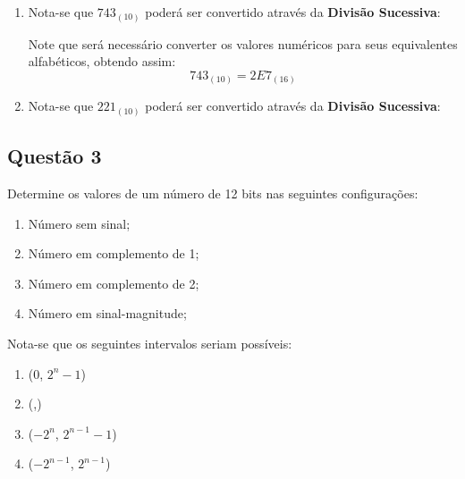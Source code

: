 \documentclass{article}
\begin{document}
\begin{resolution}
\begin{enumerate}[rightmargin = \leftmargin]
                    \item Nota-se que $743_{(10)}$ poderá ser convertido através da \textbf{Divisão Sucessiva}:
                        \begin{figure}[H]
                            \centering
                        \end{figure}
                    Note que será necessário converter os valores numéricos para seus equivalentes alfabéticos, obtendo assim:
                        \begin{equation*}
                            \boxed{743_{(10)} = 2E7_{(16)}}
                        \end{equation*}

                    \item Nota-se que $221_{(10)}$ poderá ser convertido através da \textbf{Divisão Sucessiva}:
                        \begin{figure}[H]
                            \centering
                        \end{figure}
                \end{enumerate}
            \end{resolution}
\newpage

        \subsection{Questão 3}
            \begin{exercise}
                Determine os valores de um número de 12 bits nas seguintes configurações:
                    \begin{enumerate}[noitemsep]
                        \item Número sem sinal;
                        \item Número em complemento de 1;
                        \item Número em complemento de 2;
                        \item Número em sinal-magnitude;
                    \end{enumerate}
            \end{exercise}
            \begin{resolution}
                Nota-se que os seguintes intervalos seriam possíveis:
                    \begin{enumerate}
                        \item (0, $2^{n}-1$)
                        \item (,)
                        \item ($-2^{n}$, $2^{n-1}-1$)
                        \item ($-2^{n-1}$, $2^{n-1}$)
                    \end{enumerate}
            \end{resolution}
\newpage
\end{document}
